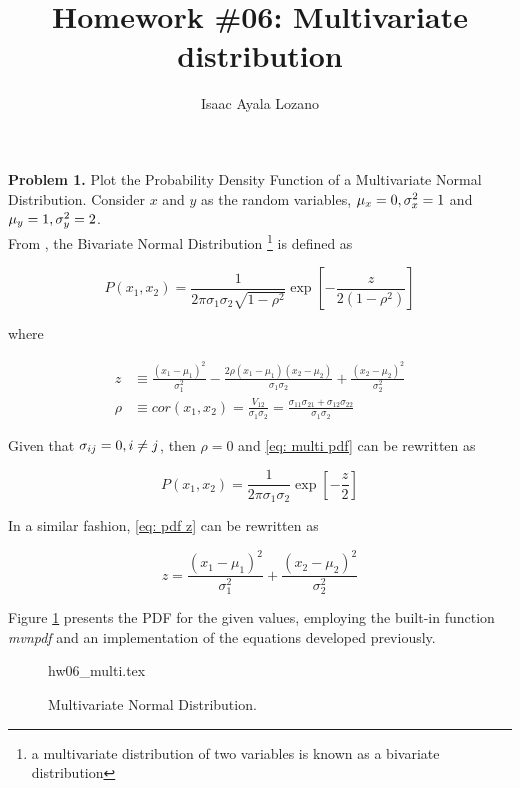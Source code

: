 \documentclass[a4paper,12pt]{article}
\title{Homework \#06: Multivariate distribution}
\author{Isaac Ayala Lozano}
\date{}
\begin{document}
\maketitle

\textbf{Problem 1.}
Plot the Probability Density Function of a Multivariate Normal Distribution.
Consider $x$ and $y$ as the random variables, $\mu_x = 0, \/ \sigma_x^2 = 1$ and $\mu_y = 1, \/ \sigma_y^2 = 2$.\\

From \cite{mathworld2020BivariateNormal}, the Bivariate Normal Distribution
\footnote{a multivariate distribution of two variables is known as a bivariate distribution}
is defined as

\begin{equation}
 P(x_1, x_2) = \frac{1}{2 \pi \sigma_1 \sigma_2 \sqrt{1-\rho^2}} \exp \left [ - \frac{z}{2 (1-\rho^2)} \right]
 \label{eq: multi pdf}
\end{equation}


where

\begin{align}
\label{eq: pdf z}
 z & \equiv \frac{(x_1-\mu_1)^2}{\sigma_1^2} - \frac{2 \rho (x_1 - \mu_1)(x_2 - \mu_2)}{\sigma_1 \sigma_2} + \frac{(x_2-\mu_2)^2}{\sigma_2^2}\\
  \rho & \equiv cor(x_1, x_2) = \frac{V_{12}}{\sigma_1 \sigma_2} = \frac{\sigma_{11}\sigma_{21} + \sigma_{12}\sigma_{22}}{\sigma_1 \sigma_2}
\end{align}

Given that $\sigma_{i\/j} = 0, \/ i \neq j $, then $\rho = 0$ and \eqref{eq: multi pdf} can be rewritten as

\begin{equation}
 P(x_1, x_2) = \frac{1}{2\pi \sigma_1 \sigma_2} \exp \left[- \frac{z}{2}  \right]
\end{equation}

In a similar fashion, \ref{eq: pdf z} can be rewritten as

\begin{equation}
 z = \frac{(x_1-\mu_1)^2}{\sigma_1^2} + \frac{(x_2-\mu_2)^2}{\sigma_2^2}
\end{equation}


Figure \ref{fig: multi} presents the PDF for the given values, employing the built-in function \emph{mvnpdf} and an implementation of the equations developed previously.

\begin{figure}[htb!]
\centering
{hw06_multi.tex}
\caption{Multivariate Normal Distribution.}
\label{fig: multi}
\end{figure}
\end{document}
